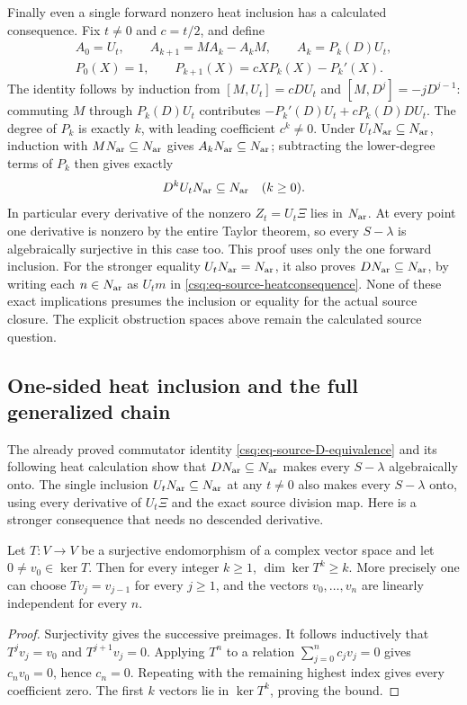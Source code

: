 Finally even a single forward nonzero heat inclusion has a calculated
consequence. Fix $t\ne0$ and $c=t/2$, and define
\begin{equation}\label{csq:eq-source-heatcommutator}
 \begin{gathered}
 A_0=U_t,\qquad A_{k+1}=MA_k-A_kM,\qquad A_k=P_k(D)U_t,\\
 P_0(X)=1,\qquad P_{k+1}(X)=cX P_k(X)-P_k'(X).
 \end{gathered}
\end{equation}
The identity follows by induction from $[M,U_t]=cDU_t$ and
$[M,D^j]=-jD^{j-1}$: commuting $M$ through $P_k(D)U_t$
contributes $-P_k'(D)U_t+cP_k(D)DU_t$.
The degree of $P_k$ is exactly $k$, with leading coefficient
$c^k\ne0$. Under $U_tN_{\rm ar}\subseteq N_{\rm ar}$, induction with
$MN_{\rm ar}\subseteq N_{\rm ar}$ gives $A_kN_{\rm ar}\subseteq N_{\rm ar}$;
subtracting the lower-degree terms of $P_k$ then gives exactly
\begin{equation}\label{csq:eq-source-heatconsequence}
 D^kU_tN_{\rm ar}\subseteq N_{\rm ar}\quad(k\geq0).
\end{equation}
In particular every derivative of the nonzero $Z_t=U_t\Xi$ lies
in $N_{\rm ar}$. At every point one derivative is nonzero by the entire
Taylor theorem, so every $S-\lambda$ is algebraically surjective
in this case too. This proof uses only the one forward inclusion.
For the stronger equality $U_tN_{\rm ar}=N_{\rm ar}$, it also proves
$DN_{\rm ar}\subseteq N_{\rm ar}$, by writing each $n\in N_{\rm ar}$ as
$U_tm$ in \eqref{csq:eq-source-heatconsequence}. None of these
exact implications presumes the inclusion or equality for the actual
source closure. The explicit obstruction spaces above remain the
calculated source question.

\subsection{One-sided heat inclusion and the full generalized chain}

The already proved commutator identity
\eqref{csq:eq-source-D-equivalence} and its following heat calculation
show that $DN_{\rm ar}\subseteq N_{\rm ar}$ makes every $S-\lambda$ algebraically
onto. The single inclusion $U_tN_{\rm ar}\subseteq N_{\rm ar}$ at any $t\ne0$
also makes every $S-\lambda$ onto, using every derivative
of $U_t\Xi$ and the exact source division map.
Here is a stronger consequence that needs no descended derivative.

\begin{cqlemma}
Let $T:V\to V$ be a surjective endomorphism of a complex vector
space and let $0\ne v_0\in\ker T$. Then for every integer $k\geq1$,
$\dim\ker T^k\geq k$. More precisely one can choose
$Tv_j=v_{j-1}$ for every $j\geq1$, and the vectors
$v_0,\ldots,v_n$ are linearly independent for every $n$.
\end{cqlemma}
\begin{proof}
Surjectivity gives the successive preimages. It follows inductively
that $T^jv_j=v_0$ and $T^{j+1}v_j=0$. Applying $T^n$ to a relation
$\sum_{j=0}^n c_jv_j=0$ gives $c_nv_0=0$, hence $c_n=0$.
Repeating with the remaining highest index gives every coefficient
zero. The first $k$ vectors lie in $\ker T^k$, proving the bound.
\end{proof}

